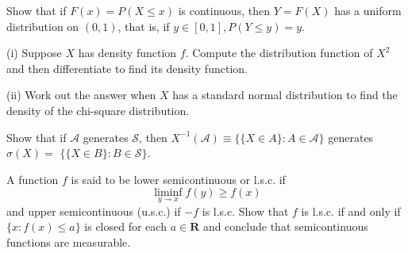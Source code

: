 \documentclass[en, normal, 11pt, black]{elegantnote}
\newenvironment{exercise}[1]{\begin{tcolorbox}[colback=black!15, colframe=black!80, breakable, title=#1]}{\end{tcolorbox}}
\begin{document}
    \begin{exercise}{1.2.4}
        Show that if $F(x)=P(X \leq x)$ is continuous, then $Y=F(X)$ has a uniform distribution on $(0,1)$, that is, if $y \in[0,1], P(Y \leq y)=y$.
    \end{exercise}

    \begin{exercise}{1.2.7}
        (i) Suppose $X$ has density function $f$. Compute the distribution function of $X^{2}$ and then differentiate to find its density function. 
        
        (ii) Work out the answer when $X$ has a standard normal distribution to find the density of the chi-square distribution. 
    \end{exercise}

    \begin{exercise}{1.3.1}
        Show that if $\mathcal{A}$ generates $\mathcal{S}$, then $X^{-1}(\mathcal{A}) \equiv\{\{X \in A\}: A \in \mathcal{A}\}$ generates $\sigma(X)=$ $\{\{X \in B\}: B \in \mathcal{S}\} .$
    \end{exercise}

    \begin{exercise}{1.3.5}
        A function $f$ is said to be lower semicontinuous or l.s.c. if
        $$
        \liminf _{y \rightarrow x} f(y) \geq f(x)
        $$
        and upper semicontinuous (u.s.c.) if $-f$ is l.s.c. Show that $f$ is l.s.c. if and only if $\{x: f(x) \leq a\}$ is closed for each $a \in \mathbf{R}$ and conclude that semicontinuous functions are measurable.
    \end{exercise}
    
\end{document}
